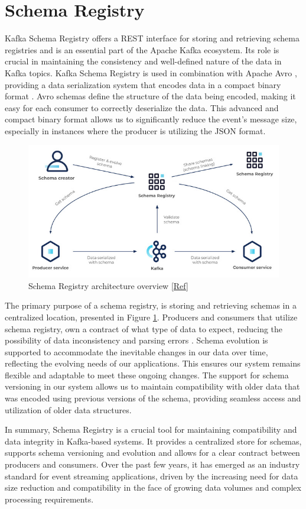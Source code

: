 \section{Schema Registry}
Kafka Schema Registry \cite{SchemaRegistry} offers a REST interface for storing and retrieving schema registries and is an essential part of the Apache Kafka ecosystem. Its role is crucial in maintaining the consistency and well-defined nature of the data in Kafka topics. Kafka Schema Registry is used in combination with Apache Avro \cite{Avro}, providing a data serialization system that encodes data in a compact binary format . Avro schemas define the structure of the data being encoded, making it easy for each consumer to correctly deserialize the data. This advanced and compact binary format allows us to significantly reduce the event’s message size, especially in instances where the producer is utilizing the JSON format.


\begin{figure}[htbp]
	\includegraphics[width=0.75\linewidth]{figures/schema-registry-ecosystem.jpg}
	\centering
	\caption{Schema Registry architecture overview \href{https://docs.confluent.io/platform/current/schema-registry/index.html}{[Ref]}}
	\label{SchemaRegistryEcosystem}
\end{figure}

The primary purpose of a schema registry, is storing and retrieving schemas in a centralized location, presented in Figure \ref{SchemaRegistryEcosystem}. Producers and consumers that utilize schema registry, own a contract of what type of data to expect, reducing the possibility of data inconsistency and parsing errors . Schema evolution is supported to accommodate the inevitable changes in our data over time, reflecting the evolving needs of our applications. This ensures our system remains flexible and adaptable to meet these ongoing changes. The support for schema versioning in our system allows us to maintain compatibility with older data that was encoded using previous versions of the schema, providing seamless access and utilization of older data structures. 

In summary, Schema Registry is a crucial tool for maintaining compatibility and data integrity in Kafka-based systems. It provides a centralized store for schemas, supports schema versioning and evolution and allows for a clear contract between producers and consumers. Over the past few years, it has emerged as an industry standard for event streaming applications, driven by the increasing need for data size reduction and compatibility in the face of growing data volumes and complex processing requirements.